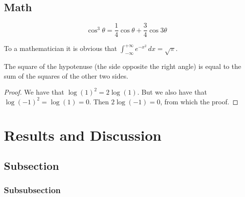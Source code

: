 \documentclass[
10pt, %
a4paper, %
oneside, %
headinclude,footinclude, %
BCOR5mm, %
]{scrartcl}
\begin{document}

\subsection{Math}

\lipsum[4] %

\begin{equation}
\cos^3 \theta =\frac{1}{4}\cos\theta+\frac{3}{4}\cos 3\theta
\label{eq:refname2}
\end{equation}

\lipsum[5] %

\begin{definition}[Gauss] 
To a mathematician it is obvious that
$\int_{-\infty}^{+\infty}
e^{-x^2}\,dx=\sqrt{\pi}$. 
\end{definition} 

\begin{theorem}[Pythagoras]
The square of the hypotenuse (the side opposite the right angle) is equal to the sum of the squares of the other two sides.
\end{theorem}

\begin{proof} 
We have that $\log(1)^2 = 2\log(1)$.
But we also have that $\log(-1)^2=\log(1)=0$.
Then $2\log(-1)=0$, from which the proof.
\end{proof}


\section{Results and Discussion}

\lipsum[10] %


\subsection{Subsection}

\lipsum[11] %

\subsubsection{Subsubsection}
\end{document}
